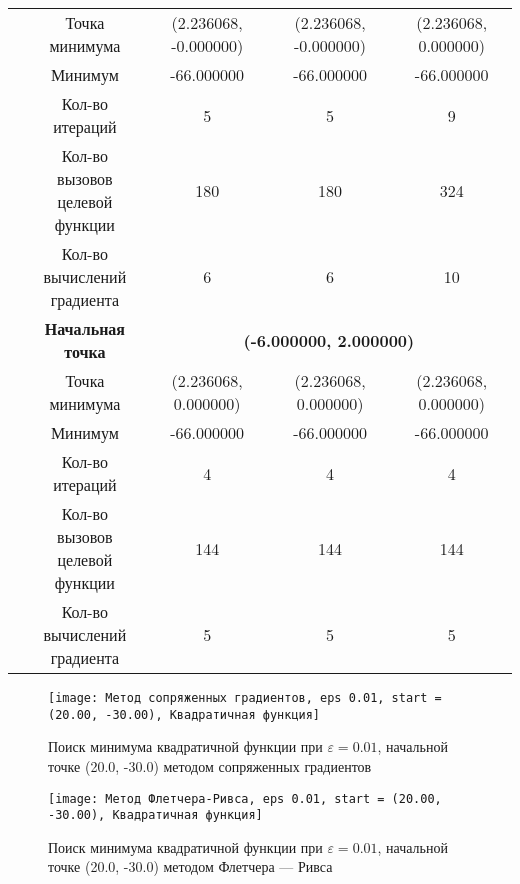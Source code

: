 \begin{table}[H]
\begin{tabular}{|c|c|c|c|c|}
	\cline{2-5}
	&Точка минимума &(2.236068, -0.000000) &(2.236068, -0.000000) &(2.236068, 0.000000) \\ 
	\cline{2-5}
	&Минимум &-66.000000 &-66.000000 &-66.000000 \\ 
	\cline{2-5}
	&Кол-во итераций &5 &5 &9 \\ 
	\cline{2-5}
	&\makecell{Кол-во вызовов\\целевой функции} &180 &180 &324 \\ 
	\cline{2-5}
	&\makecell{Кол-во вычислений\\градиента} &6 &6 &10 \\ 
	\cline{2-5}
\cline{2-5}&\textbf{Начальная точка} &\multicolumn{3}{c|}{\textbf{(-6.000000, 2.000000)}}\\
	\cline{2-5}
	&Точка минимума &(2.236068, 0.000000) &(2.236068, 0.000000) &(2.236068, 0.000000) \\ 
	\cline{2-5}
	&Минимум &-66.000000 &-66.000000 &-66.000000 \\ 
	\cline{2-5}
	&Кол-во итераций &4 &4 &4 \\ 
	\cline{2-5}
	&\makecell{Кол-во вызовов\\целевой функции} &144 &144 &144 \\ 
	\cline{2-5}
	&\makecell{Кол-во вычислений\\градиента} &5 &5 &5 \\ 
	\cline{2-5}
	\hline

\end{tabular}
\end{table}


            \begin{figure}[H]
	        \centering
	        \texttt{[image: Метод сопряженных градиентов, eps 0.01, start = (20.00, -30.00), Квадратичная функция]}%
	        \caption{Поиск минимума квадратичной функции при $\varepsilon = 0.01$, начальной точке (20.0, -30.0) методом сопряженных градиентов}
	        \vspace*{-1.2cm}
            \end{figure}
            
            \begin{figure}[H]
	        \centering
	        \texttt{[image: Метод Флетчера-Ривса, eps 0.01, start = (20.00, -30.00), Квадратичная функция]}%
	        \caption{Поиск минимума квадратичной функции при $\varepsilon = 0.01$, начальной точке (20.0, -30.0) методом Флетчера --- Ривса}
	        \vspace*{-1.2cm}
            \end{figure}
            

